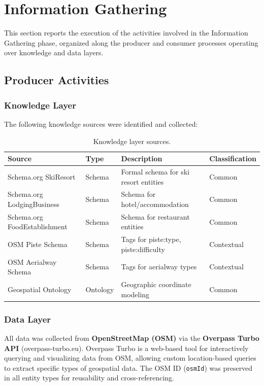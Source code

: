 \section{Information Gathering}

This section reports the execution of the activities involved in the Information Gathering phase, organized along the producer and consumer processes operating over knowledge and data layers.

\subsection{Producer Activities}

\subsubsection{Knowledge Layer}

The following knowledge sources were identified and collected:

\begin{table}[h!]
\centering
\small
\begin{tabular}{|l|l|p{5.5cm}|l|}
\hline
\textbf{Source} & \textbf{Type} & \textbf{Description} & \textbf{Classification} \\
\hline
Schema.org SkiResort & Schema & Formal schema for ski resort entities & Common \\
Schema.org LodgingBusiness & Schema & Schema for hotel/accommodation & Common \\
Schema.org FoodEstablishment & Schema & Schema for restaurant entities & Common \\
OSM Piste Schema & Schema & Tags for piste:type, piste:difficulty & Contextual \\
OSM Aerialway Schema & Schema & Tags for aerialway types & Contextual \\
Geospatial Ontology & Ontology & Geographic coordinate modeling & Common \\
\hline
\end{tabular}
\caption{Knowledge layer sources.}
\end{table}

\subsubsection{Data Layer}

All data was collected from \textbf{OpenStreetMap (OSM)} via the \textbf{Overpass Turbo API} (overpass-turbo.eu). Overpass Turbo is a web-based tool for interactively querying and visualizing data from OSM, allowing custom location-based queries to extract specific types of geospatial data. The OSM ID (\texttt{osmId}) was preserved in all entity types for reusability and cross-referencing.\\

